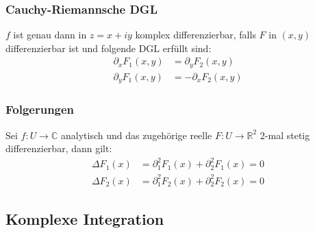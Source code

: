 \documentclass[4pt,a4paper]{scrartcl}
\begin{document}
\begin{multicols}{4}
\subsubsection{Cauchy-Riemannsche DGL}
$f$ ist genau dann in $z=x+iy$ komplex differenzierbar, falls $F$ in $(x,y)$ differenzierbar ist und folgende DGL erfüllt sind:
\begin{equation*}
\begin{split}
\partial_x F_1(x,y)&=\partial_y F_2(x,y)\\
\partial_y F_1(x,y)&=-\partial_x F_2(x,y)
\end{split}
\end{equation*}

\subsubsection{Folgerungen}
Sei $f:U\rightarrow\mathbb{C}$ analytisch und das zugehörige reelle $F:U\rightarrow\mathbb{R}^2$ 2-mal stetig differenzierbar, dann gilt:
\begin{equation*}
\begin{split}
\Delta F_1(x)&=\partial_1^2F_1(x)+\partial_2^2 F_1(x)=0\\
\Delta F_2(x)&=\partial_1^2F_2(x)+\partial_2^2 F_2(x)=0
\end{split}
\end{equation*}
\subsection{Komplexe Integration}


\end{multicols}
\end{document}

